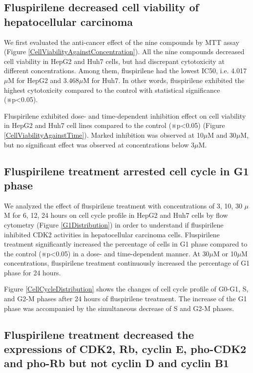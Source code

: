 \documentclass[10pt]{article}
\begin{document}
\subsection*{Fluspirilene decreased cell viability of hepatocellular carcinoma}

We first evaluated the anti-cancer effect of the nine compounds by MTT assay (Figure \ref{CellViabilityAgainstConcentration}). All the nine compounds decreased cell viability in HepG2 and Huh7 cells, but had discrepant cytotoxicity at different concentrations. Among them, fluspirilene had the lowest IC50, i.e. 4.017$\mu$M for HepG2 and 3.468$\mu$M for Huh7. In other words, fluspirilene exhibited the highest cytotoxicity compared to the control with statistical significance (※p<0.05).

Fluspirilene exhibited dose- and time-dependent inhibition effect on cell viability in HepG2 and Huh7 cell lines compared to the control (※p<0.05) (Figure \ref{CellViabilityAgainstTime}). Marked inhibition was observed at 10$\mu$M and 30$\mu$M, but no significant effect was observed at concentrations below 3$\mu$M.

\subsection*{Fluspirilene treatment arrested cell cycle in G1 phase}

We analyzed the effect of fluspirilene treatment with concentrations of 3, 10, 30 $\mu$M for 6, 12, 24 hours on cell cycle profile in HepG2 and Huh7 cells by flow cytometry (Figure \ref{G1Distribution}) in order to understand if fluspirilene inhibited CDK2 activities in hepatocellular carcinoma cells. Fluspirilene treatment significantly increased the percentage of cells in G1 phase compared to the control (※p<0.05) in a dose- and time-dependent manner. At 30$\mu$M or 10$\mu$M concentrations, fluspirilene treatment continuously increased the percentage of G1 phase for 24 hours.

Figure \ref{CellCycleDistribution} shows the changes of cell cycle profile of G0-G1, S, and G2-M phases after 24 hours of fluspirilene treatment. The increase of the G1 phase was accompanied by the simultaneous decrease of S and G2-M phases.

\subsection*{Fluspirilene treatment decreased the expressions of CDK2, Rb, cyclin E, pho-CDK2 and pho-Rb but not cyclin D and cyclin B1}
\end{document}
